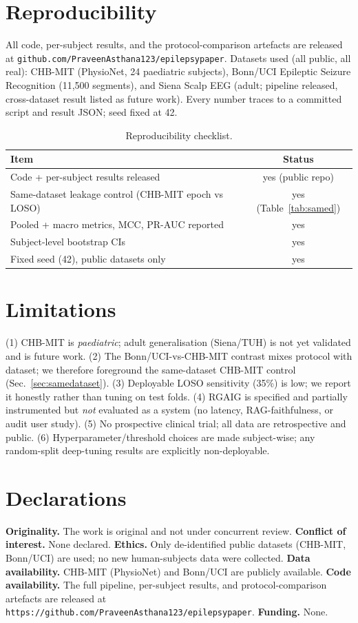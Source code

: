\documentclass[10pt,journal,twocolumn]{IEEEtran}
\begin{document}
\section{Reproducibility}
All code, per-subject results, and the protocol-comparison artefacts are released at
\texttt{github.com/PraveenAsthana123/epilepsypaper}. Datasets used (all public, all real):
CHB-MIT (PhysioNet, 24 paediatric subjects), Bonn/UCI Epileptic Seizure Recognition
(11{,}500 segments), and Siena Scalp EEG (adult; pipeline released, cross-dataset result
listed as future work). Every number traces to a committed script and result JSON; seed fixed at 42.
\begin{table}[t]\centering\caption{Reproducibility checklist.}\label{tab:repro}
\begin{tabular}{lc}\toprule
Item & Status\\\midrule
Code + per-subject results released & yes (public repo)\\
Same-dataset leakage control (CHB-MIT epoch vs LOSO) & yes (Table~\ref{tab:samed})\\
Pooled + macro metrics, MCC, PR-AUC reported & yes\\
Subject-level bootstrap CIs & yes\\
Fixed seed (42), public datasets only & yes\\\bottomrule
\end{tabular}\end{table}

\section{Limitations}
(1) CHB-MIT is \emph{paediatric}; adult generalisation (Siena/TUH) is not yet validated and is future work. (2) The Bonn/UCI-vs-CHB-MIT contrast mixes protocol with dataset; we therefore foreground the same-dataset CHB-MIT control (Sec.~\ref{sec:samedataset}). (3) Deployable LOSO sensitivity (35\%) is low; we report it honestly rather than tuning on test folds. (4) RGAIG is specified and partially instrumented but \emph{not} evaluated as a system (no latency, RAG-faithfulness, or audit user study). (5) No prospective clinical trial; all data are retrospective and public. (6) Hyperparameter/threshold choices are made subject-wise; any random-split deep-tuning results are explicitly non-deployable.

\section{Declarations}
\textbf{Originality.} The work is original and not under concurrent review. \textbf{Conflict of interest.} None declared. \textbf{Ethics.} Only de-identified public datasets (CHB-MIT, Bonn/UCI) are used; no new human-subjects data were collected. \textbf{Data availability.} CHB-MIT (PhysioNet) and Bonn/UCI are publicly available. \textbf{Code availability.} The full pipeline, per-subject results, and protocol-comparison artefacts are released at \texttt{https://github.com/PraveenAsthana123/epilepsypaper}. \textbf{Funding.} None.
\end{document}
